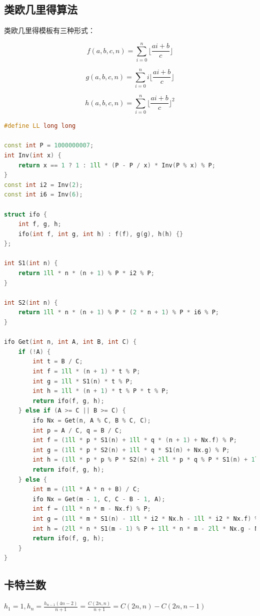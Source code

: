 \documentclass{article}
\begin{document}
\subsection{类欧几里得算法}

类欧几里得模板有三种形式：

$$f(a, b, c, n) = \sum\limits_{i = 0}^{n} \lfloor \frac{ai+b}{c} \rfloor $$

$$g(a, b, c, n) = \sum\limits_{i = 0}^{n} i \lfloor \frac{ai+b}{c} \rfloor $$

$$h(a, b, c, n) = \sum\limits_{i = 0}^{n} \lfloor \frac{ai+b}{c} \rfloor ^2 $$



\begin{lstlisting}[language=C++]
#define LL long long

const int P = 1000000007;
int Inv(int x) {
	return x == 1 ? 1 : 1ll * (P - P / x) * Inv(P % x) % P;
}
const int i2 = Inv(2);
const int i6 = Inv(6);

struct ifo {
	int f, g, h;
	ifo(int f, int g, int h) : f(f), g(g), h(h) {}
};

int S1(int n) {
	return 1ll * n * (n + 1) % P * i2 % P;
}

int S2(int n) {
	return 1ll * n * (n + 1) % P * (2 * n + 1) % P * i6 % P;
}

ifo Get(int n, int A, int B, int C) {
	if (!A) {
		int t = B / C;
		int f = 1ll * (n + 1) * t % P;
		int g = 1ll * S1(n) * t % P;
		int h = 1ll * (n + 1) * t % P * t % P;
		return ifo(f, g, h);
	} else if (A >= C || B >= C) {
		ifo Nx = Get(n, A % C, B % C, C);
		int p = A / C, q = B / C;
		int f = (1ll * p * S1(n) + 1ll * q * (n + 1) + Nx.f) % P;
		int g = (1ll * p * S2(n) + 1ll * q * S1(n) + Nx.g) % P;
		int h = (1ll * p * p % P * S2(n) + 2ll * p * q % P * S1(n) + 1ll * (n + 1) * q % P * q + 2ll * p * Nx.g % P + 2ll * q * Nx.f % P + Nx.h) % P;
		return ifo(f, g, h);
	} else {
		int m = (1ll * A * n + B) / C;
		ifo Nx = Get(m - 1, C, C - B - 1, A);
		int f = (1ll * n * m - Nx.f) % P;
		int g = (1ll * m * S1(n) - 1ll * i2 * Nx.h - 1ll * i2 * Nx.f) % P;
		int h = (2ll * n * S1(m - 1) % P + 1ll * n * m - 2ll * Nx.g - Nx.f) % P;
		return ifo(f, g, h);
	}
}
\end{lstlisting}

\subsection{卡特兰数}
$h_1 = 1, h_n = \frac{h_{n-1}(4n-2)}{n+1} = \frac{C(2n, n)}{n+1} = C(2n, n) - C(2n, n-1)$ 
\end{document}
